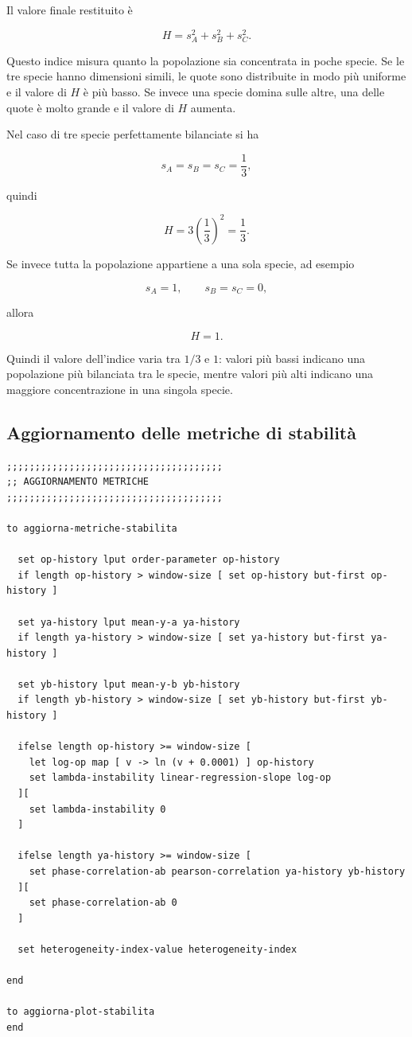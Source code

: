 Il valore finale restituito è

\[
H =
s_A^2+s_B^2+s_C^2.
\]

Questo indice misura quanto la popolazione sia concentrata in poche specie.
Se le tre specie hanno dimensioni simili, le quote sono distribuite in modo più
uniforme e il valore di \(H\) è più basso. Se invece una specie domina sulle
altre, una delle quote è molto grande e il valore di \(H\) aumenta.

Nel caso di tre specie perfettamente bilanciate si ha

\[
s_A=s_B=s_C=\frac{1}{3},
\]

quindi

\[
H=
3\left(\frac{1}{3}\right)^2
=
\frac{1}{3}.
\]

Se invece tutta la popolazione appartiene a una sola specie, ad esempio

\[
s_A=1,
\qquad
s_B=s_C=0,
\]

allora

\[
H=1.
\]

Quindi il valore dell'indice varia tra \(1/3\) e \(1\): valori più bassi indicano
una popolazione più bilanciata tra le specie, mentre valori più alti indicano una
maggiore concentrazione in una singola specie.

\subsection{Aggiornamento delle metriche di stabilità}

\begin{lstlisting}[caption={Procedura di aggiornamento delle metriche di stabilità del sistema}]
;;;;;;;;;;;;;;;;;;;;;;;;;;;;;;;;;;;;;;
;; AGGIORNAMENTO METRICHE
;;;;;;;;;;;;;;;;;;;;;;;;;;;;;;;;;;;;;;

to aggiorna-metriche-stabilita

  set op-history lput order-parameter op-history
  if length op-history > window-size [ set op-history but-first op-history ]

  set ya-history lput mean-y-a ya-history
  if length ya-history > window-size [ set ya-history but-first ya-history ]

  set yb-history lput mean-y-b yb-history
  if length yb-history > window-size [ set yb-history but-first yb-history ]

  ifelse length op-history >= window-size [
    let log-op map [ v -> ln (v + 0.0001) ] op-history
    set lambda-instability linear-regression-slope log-op
  ][
    set lambda-instability 0
  ]

  ifelse length ya-history >= window-size [
    set phase-correlation-ab pearson-correlation ya-history yb-history
  ][
    set phase-correlation-ab 0
  ]

  set heterogeneity-index-value heterogeneity-index

end

to aggiorna-plot-stabilita
end
\end{lstlisting}

